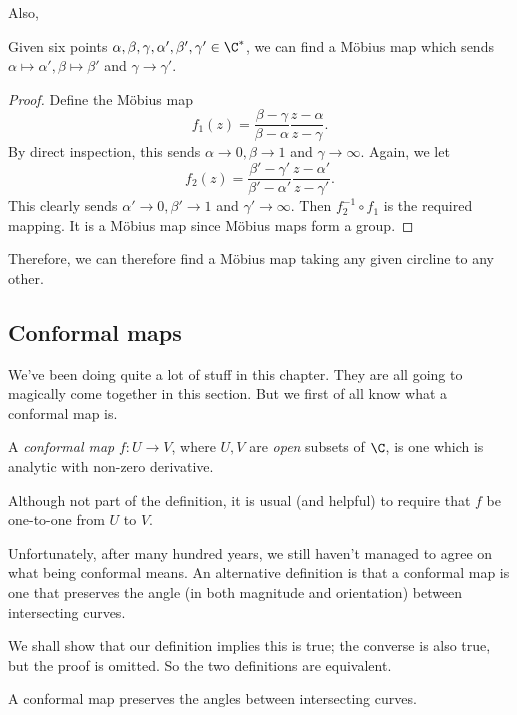 \documentclass[a4paper]{article}
\begin{document}
Also,
\begin{prop}
  Given six points $\alpha, \beta, \gamma, \alpha', \beta', \gamma' \in \C^*$, we can find a M\"obius map which sends $\alpha \mapsto \alpha', \beta \mapsto \beta'$ and $\gamma \to \gamma'$.
\end{prop}

\begin{proof}
  Define the M\"obius map
  \[
    f_1(z) = \frac{\beta - \gamma}{\beta - \alpha} \frac{z - \alpha}{z - \gamma}.
  \]
  By direct inspection, this sends $\alpha \to 0, \beta \to 1$ and $\gamma \to \infty$. Again, we let
  \[
    f_2(z) = \frac{\beta' - \gamma'}{\beta' - \alpha'} \frac{z - \alpha'}{z - \gamma'}.
  \]
  This clearly sends $\alpha' \to 0, \beta' \to 1$ and $\gamma' \to \infty$. Then $f_2^{-1} \circ f_1$ is the required mapping. It is a M\"obius map since M\"obius maps form a group.
\end{proof}

Therefore, we can therefore find a M\"obius map taking any given circline to any other.

\subsection{Conformal maps}
We've been doing quite a lot of stuff in this chapter. They are all going to magically come together in this section. But we first of all know what a conformal map is.

\begin{defi}
  A \emph{conformal map} $f: U \to V$, where $U, V$ are \emph{open} subsets of $\C$, is one which is analytic with non-zero derivative.
\end{defi}
Although not part of the definition, it is usual (and helpful) to require that $f$ be one-to-one from $U$ to $V$.

Unfortunately, after many hundred years, we still haven't managed to agree on what being conformal means. An alternative definition is that a conformal map is one that preserves the angle (in both magnitude and orientation) between intersecting curves.

We shall show that our definition implies this is true; the converse is also true, but the proof is omitted. So the two definitions are equivalent.

\begin{prop}
  A conformal map preserves the angles between intersecting curves.
\end{prop}
\end{document}
